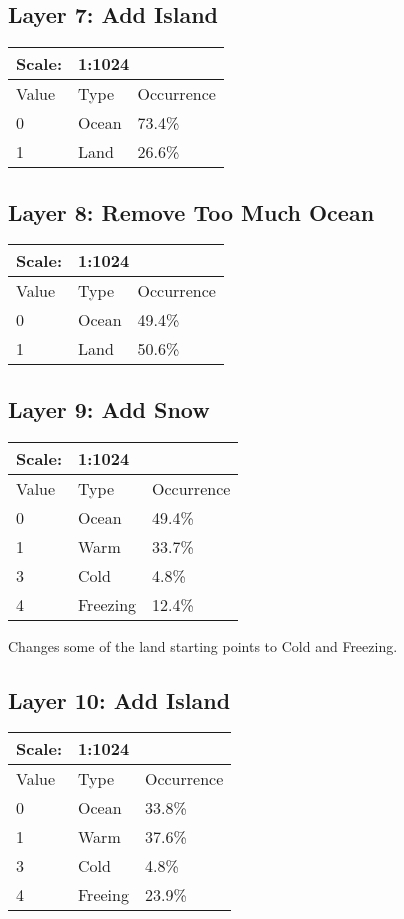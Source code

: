\documentclass{article}
\begin{document}
	\subsection{Layer 7: Add Island}
	\begin{tabular}{|l|l|l|}\hline
		Scale: & \multicolumn{2}{|l|}{1:1024} \\\hline\hline
		Value  & Type   & Occurrence \\\hline
		0      & Ocean  & 73.4\%\\\hline
		1      & Land   & 26.6\%\\\hline
	\end{tabular}

	\subsection{Layer 8: Remove Too Much Ocean}
	\begin{tabular}{|l|l|l|}\hline
		Scale: & \multicolumn{2}{|l|}{1:1024} \\\hline\hline
		Value  & Type   & Occurrence \\\hline
		0      & Ocean  & 49.4\%\\\hline
		1      & Land   & 50.6\%\\\hline
	\end{tabular}
	
	
	\subsection{Layer 9: Add Snow}
	\begin{tabular}{|l|l|l|}\hline
		Scale: & \multicolumn{2}{|l|}{1:1024} \\\hline\hline
		Value  & Type     & Occurrence \\\hline
		0      & Ocean    & 49.4\%\\\hline
		1      & Warm     & 33.7\%\\\hline
		3      & Cold     & 4.8\%\\\hline
		4      & Freezing & 12.4\%\\\hline
	\end{tabular}
	
	\medskip\noindent
	Changes some of the land starting points to Cold and Freezing.

	\subsection{Layer 10: Add Island}
	\begin{tabular}{|l|l|l|}\hline
		Scale: & \multicolumn{2}{|l|}{1:1024} \\\hline\hline
		Value  & Type    & Occurrence \\\hline
		0      & Ocean   & 33.8\%\\\hline
		1      & Warm    & 37.6\%\\\hline
		3      & Cold    & 4.8\%\\\hline
		4      & Freeing & 23.9\%\\\hline
	\end{tabular}
	
\end{document}
